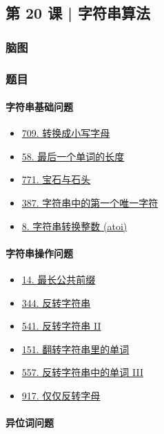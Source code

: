 \subsection{第 20 课 | 字符串算法}

\subsubsection{脑图}

\subsubsection{题目}

\paragraph{字符串基础问题}

\begin{itemize}
  \item \hyperref[leetcode:709]{709. 转换成小写字母}
  \item \hyperref[leetcode:58]{58. 最后一个单词的长度}
  \item \hyperref[leetcode:771]{771. 宝石与石头}
  \item \hyperref[leetcode:387]{387. 字符串中的第一个唯一字符}
  \item \hyperref[leetcode:8]{8. 字符串转换整数 (atoi)}
\end{itemize}

\paragraph{字符串操作问题}

\begin{itemize}
  \item \hyperref[leetcode:14]{14. 最长公共前缀}
  \item \hyperref[leetcode:344]{344. 反转字符串}
  \item \hyperref[leetcode:541]{541. 反转字符串 II}
  \item \hyperref[leetcode:151]{151. 翻转字符串里的单词}
  \item \hyperref[leetcode:557]{557. 反转字符串中的单词 III}
  \item \hyperref[leetcode:917]{917. 仅仅反转字母}
\end{itemize}

\paragraph{异位词问题}

